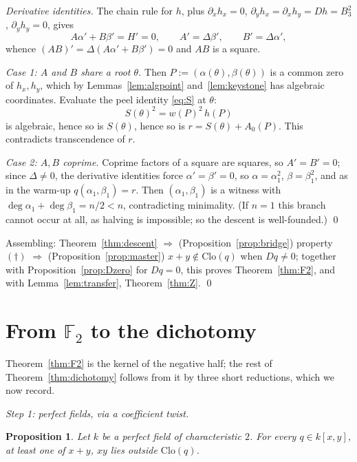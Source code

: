 \documentclass[11pt]{article}
\newtheorem{proposition}[theorem]{Proposition}
\theoremstyle{definition}
\theoremstyle{remark}
\newcommand{\F}{\mathbb{F}}
\newcommand{\Clo}{\mathrm{Clo}}
\begin{document}
\emph{Derivative identities.}  The chain rule for $h$, plus
$\partial_x h_x = 0$,
$\partial_y h_x = \partial_x h_y = Dh = B_3^2$,
$\partial_y h_y = 0$, gives
\[
  A\alpha' + B\beta' = H' = 0,
  \qquad A' = \Delta\beta', \qquad B' = \Delta\alpha' ,
\]
whence $(AB)' = \Delta(A\alpha' + B\beta') = 0$ and $AB$ is a square.

\emph{Case 1: $A$ and $B$ share a root $\theta$.}  Then
$P := (\alpha(\theta), \beta(\theta))$ is a common zero of
$h_x, h_y$, which by Lemmas~\ref{lem:algpoint}
and~\ref{lem:keystone} has algebraic coordinates.  Evaluate the peel
identity \eqref{eq:S} at $\theta$:
\[
  S(\theta)^2 = w(P)^2\, h(P)
\]
is algebraic, hence so is $S(\theta)$, hence so is
$r = S(\theta) + A_0(P)$.  This contradicts transcendence of $r$.

\emph{Case 2: $A, B$ coprime.}  Coprime factors of a square
are squares, so $A' = B' = 0$; since $\Delta \neq 0$, the derivative
identities force $\alpha' = \beta' = 0$, so $\alpha = \alpha_1^2$,
$\beta = \beta_1^2$, and as in the warm-up
$q(\alpha_1, \beta_1) = r$.  Then $(\alpha_1, \beta_1)$ is a witness
with $\deg\alpha_1 + \deg\beta_1 = n/2 < n$, contradicting
minimality.  (If $n = 1$ this branch cannot occur at all, as halving
is impossible; so the descent is well-founded.)  \qed

\medskip

Assembling: Theorem~\ref{thm:descent} $\Rightarrow$
(Proposition~\ref{prop:bridge}) property $(\dagger)$ $\Rightarrow$
(Proposition~\ref{prop:master})
$x+y \notin \Clo(q)$ when $Dq \neq 0$; together with Proposition~\ref{prop:Dzero} for
$Dq = 0$, this proves Theorem~\ref{thm:F2}, and with
Lemma~\ref{lem:transfer}, Theorem~\ref{thm:Z}.  \qed

\section{From $\F_2$ to the dichotomy}\label{sec:tothedichotomy}

Theorem~\ref{thm:F2} is the kernel of the negative half; the rest of
Theorem~\ref{thm:dichotomy} follows from it by three short
reductions, which we now record.

\medskip
\noindent\emph{Step 1: perfect fields, via a coefficient twist.}

\begin{proposition}\label{prop:perfect}
Let $k$ be a perfect field of characteristic $2$.  For every
$q \in k[x,y]$, at least one of $x+y$, $xy$ lies outside $\Clo(q)$.
\end{proposition}
\end{document}

